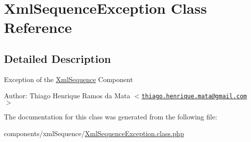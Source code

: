 \hypertarget{class_xml_sequence_exception}{
\section{XmlSequenceException Class Reference}
\label{class_xml_sequence_exception}
}


\subsection{Detailed Description}
Exception of the \hyperlink{class_xml_sequence}{XmlSequence} Component \begin{Desc}
\item[Author:]Thiago Henrique Ramos da Mata $<$\href{mailto:thiago.henrique.mata@gmail.com}{\tt thiago.henrique.mata@gmail.com}$>$ \end{Desc}


The documentation for this class was generated from the following file:\begin{CompactItemize}
\item 
components/xmlSequence/\hyperlink{_xml_sequence_exception_8class_8php}{XmlSequenceException.class.php}\end{CompactItemize}
